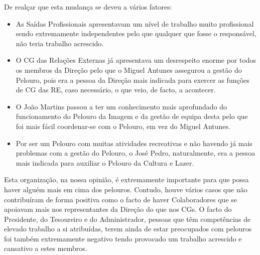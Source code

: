 De realçar que esta mudança se deveu a vários fatores:
\begin{itemize}
\item As Saídas Profissionais apresentavam um nível de trabalho muito profissional sendo extremamente independentes pelo que qualquer que fosse o responsável, não teria trabalho acrescido.
\item O CG das Relações Externas já apresentava um desrespeito enorme por todos os membros da Direção pelo que o Miguel Antunes assegurou a gestão do Pelouro, pois era a pessoa da Direção mais indicada para exercer as funções de CG das RE, caso necessário, o que veio, de facto, a acontecer.
\item O João Martins passou a ter um conhecimento mais aprofundado do funcionamento do Pelouro da Imagem e da gestão de equipa desta pelo que foi mais fácil coordenar-se com o Pelouro, em vez do Miguel Antunes.
\item Por ser um Pelouro com muitas atividades recreativas e não havendo já mais problemas com a gestão do Pelouro, o José Pedro, naturalmente, era a pessoa mais indicada para auxiliar o Pelouro da Cultura e Lazer.
\end{itemize}

Esta organização, na nossa opinião, é extremamente importante para que possa haver alguém mais em cima dos pelouros. Contudo, houve vários casos que não contribuíram de forma positiva como o facto de haver Colaboradores que se apoiavam mais nos representantes da Direção do que nos CGs. O facto do Presidente, do Tesoureiro e do Administrador, pessoas que têm competências de elevado trabalho a si atribuídas, terem ainda de estar preocupados com pelouros foi também extremamente negativo tendo provocado um trabalho acrescido e cansativo a estes membros.
